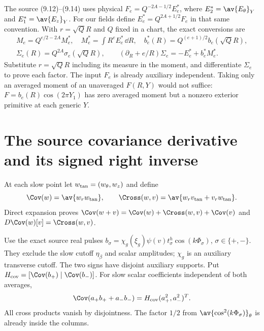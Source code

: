 The source (9.12)--(9.14) uses physical
$F_e=Q^{-2A-1/2}E_e^*$, where
$E_2^*=\av{E_\theta}_Y$ and $E_1^*=\av{E_z}_Y$.
For our fields define $E_e^*=Q^{2A+1/2}F_e$ in that same convention.
With $r=\sqrt Q R$ and $Q$ fixed in a chart, the exact conversions are
\begin{gather}
 M_e=Q^{e/2-2A}M_e^*,\quad M_e^*=\int R^eE_e^*\,\dd R,\quad
 b_e^*(R)=Q^{(e+1)/2}b_e(\sqrt Q R),\nonumber\\
 \Sigma_e(R)=Q^{2A}\sigma_e(\sqrt Q R),\qquad
 (\partial_R+e/R)\Sigma_e=-E_e^*+b_e^*M_e^*. \label{nsbridge:cb:chart}
\end{gather}
Substitute $r=\sqrt Q R$ including its measure in the moment, and
differentiate $\Sigma_e$ to prove each factor. The input $F_e$ is already
auxiliary independent. Taking only an averaged moment of an unaveraged
$F(R,Y)$ would not suffice: $F=b_e(R)\cos(2\pi Y_1)$ has zero averaged
moment but a nonzero exterior primitive at each generic $Y$.

\section{The source covariance derivative and its signed right inverse}
At each slow point let $w_{\rm tan}=(w_\theta,w_z)$ and define
\[
 \Cov(w)=\av{w_rw_{\rm tan}},\qquad
 \Cross(w,v)=\av{w_rv_{\rm tan}+v_rw_{\rm tan}}.
\]
Direct expansion proves
$\Cov(w+v)=\Cov(w)+\Cross(w,v)+\Cov(v)$ and
$D\Cov(w)[v]=\Cross(w,v)$.

Use the exact source real pulses
$b_\sigma=\chi_g(\xi_g)\psi(v)t_\sigma^h\cos(k\Phi_\sigma)$,
$\sigma\in\{+,-\}$. They exclude the slow cutoff $\eta_\beta$ and
scalar amplitudes; $\chi_g$ is an auxiliary transverse cutoff.
The two signs have disjoint auxiliary supports. Put
$H_{\rm cov}=[\Cov(b_+)\mid\Cov(b_-)]$.
For slow scalar coefficients independent of both averages,
\[
 \Cov(a_+b_++a_-b_-)=H_{\rm cov}(a_+^2,a_-^2)^T.
\]
All cross products vanish by disjointness. The factor $1/2$ from
$\av{\cos^2(k\Phi_\sigma)}_\theta$ is already inside the columns.

